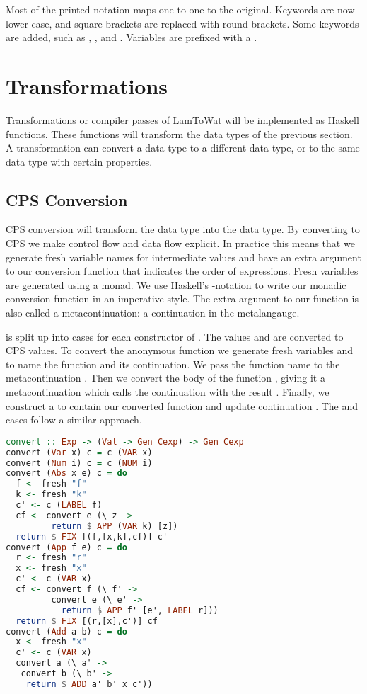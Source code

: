 {Most of the printed notation maps one-to-one to the original. Keywords are now lower case, and square brackets are replaced with round brackets. Some keywords are added, such as , , and . Variables are prefixed with a \icode{$}. 

\section{\label{section:transforms}Transformations}
Transformations or compiler passes of LamToWat will be implemented as Haskell functions. These functions will transform the data types of the previous section. A transformation can convert a data type to a different data type, or to the same data type with certain properties.

\subsection{\label{subsection:cpsconvert}CPS Conversion}
\ac{CPS} conversion will transform the  data type into the  data type. By converting to \ac{CPS} we make control flow and data flow explicit. In practice this means that we generate fresh variable names for intermediate values and have an extra argument to our conversion function that indicates the order of expressions. Fresh variables are generated using a monad. We use Haskell's -notation to write our monadic conversion function in an imperative style. The extra argument to our function is also called a metacontinuation: a continuation in the metalangauge.

 is split up into cases for each constructor of . The values  and  are converted to \ac{CPS} values. To convert the anonymous 
function  we generate fresh variables  and  to name the function and its continuation. We pass the function name to the metacontinuation . Then we convert the body of the function , giving it a metacontinuation which calls the continuation with the result . Finally, we construct a  to contain our converted function and update continuation . The  and  cases follow a similar approach.

\begin{lstlisting}[language=Haskell]
convert :: Exp -> (Val -> Gen Cexp) -> Gen Cexp
convert (Var x) c = c (VAR x)
convert (Num i) c = c (NUM i)
convert (Abs x e) c = do
  f <- fresh "f"
  k <- fresh "k"
  c' <- c (LABEL f)
  cf <- convert e (\ z ->
         return $ APP (VAR k) [z])
  return $ FIX [(f,[x,k],cf)] c'
convert (App f e) c = do
  r <- fresh "r"
  x <- fresh "x"
  c' <- c (VAR x)
  cf <- convert f (\ f' ->
         convert e (\ e' ->
           return $ APP f' [e', LABEL r]))
  return $ FIX [(r,[x],c')] cf
convert (Add a b) c = do
  x <- fresh "x"
  c' <- c (VAR x)
  convert a (\ a' ->
   convert b (\ b' ->
    return $ ADD a' b' x c'))
\end{lstlisting}

}
